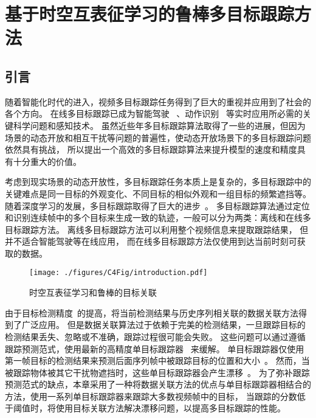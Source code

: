 



\chapter{基于时空互表征学习的鲁棒多目标跟踪方法}
\label{chap:stml}


\section{引言}
随着智能化时代的进入，视频多目标跟踪任务得到了巨大的重视并应用到了社会的各个方向。
在线多目标跟踪已成为智能驾驶~\cite{geiger2012are} 、动作识别~\cite{RN583} 等实时应用所必需的关键科学问题和感知技术。
虽然近些年多目标跟踪算法取得了一些的进展，但因为场景的动态开放和相互干扰等问题的普遍性，使动态开放场景下的多目标跟踪问题依然具有挑战，
所以提出一个高效的多目标跟踪算法来提升模型的速度和精度具有十分重大的价值。

考虑到现实场景的动态开放性，多目标跟踪任务本质上是复杂的，多目标跟踪中的关键难点是同一目标的外观变化、不同目标的相似外观和一组目标的频繁遮挡等。
随着深度学习的发展，多目标跟踪取得了巨大的进步~\cite{RN550,wen2020ua-detrac}。
多目标跟踪算法通过定位和识别连续帧中的多个目标来生成一致的轨迹，一般可以分为两类：离线和在线多目标跟踪方法。
离线多目标跟踪方法可以利用整个视频信息来提取跟踪结果，
但并不适合智能驾驶等在线应用，
而在线多目标跟踪方法仅使用到达当前时刻可获取的数据。

\begin{figure*}[ht]
	\centering
	\texttt{[image: ./figures/C4Fig/introduction.pdf]}
	\vspace{0.2em}
	\caption{时空互表征学习和鲁棒的目标关联}
	\label{fig:sture_introduction}
\end{figure*}

由于目标检测精度~\cite{ren2017faster}的提高，将当前检测结果与历史序列相关联的数据关联方法得到了广泛应用。
但是数据关联算法过于依赖于完美的检测结果，一旦跟踪目标的检测结果丢失、忽略或不准确，跟踪过程很可能会失败。
这些问题可以通过遵循跟踪预测范式，使用最新的高精度单目标跟踪器~\cite{RN1215,RN1212,RN1214} 来缓解。
单目标跟踪器仅使用第一帧目标的检测结果来预测后面序列帧中被跟踪目标的位置和大小~\cite{li2016robust}。
然而，当被跟踪物体被其它干扰物遮挡时，这些单目标跟踪器会产生漂移~\cite{RN717,2021Person}。
为了弥补跟踪预测范式的缺点，本章采用了一种将数据关联方法的优点与单目标跟踪器相结合的方法，使用一系列单目标跟踪器来跟踪大多数视频帧中的目标，
当跟踪的分数低于阈值时，将使用目标关联方法解决漂移问题，以提高多目标跟踪的性能。


